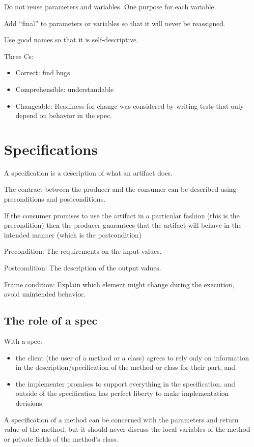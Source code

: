 \documentclass[letterpaper,12pt]{article}
\begin{document}
Do not reuse parameters and variables. One purpose for each variable.

Add ``final'' to parameters or variables so that it will never be reassigned.

Use good names so that it is self-descriptive.

Three Cs:
\begin{itemize}
      \item Correct: find bugs
      \item Comprehensible: understandable
      \item Changeable: Readiness for change was considered by writing tests that only
            depend on behavior in the spec.
\end{itemize}

\section{Specifications}
A specification is a description of what an artifact does.

The contract between the producer and the consumer can be described using
preconditions and postconditions.

If the consumer promises to use the artifact in a particular fashion (this is
the precondition) then the producer guarantees that the artifact will behave in
the intended manner (which is the postcondition)

Precondition: The requirements on the input values.

Postcondition: The description of the output values.

Frame condition: Explain which element might change during the execution, avoid
unintended behavior.
\subsection{The role of a spec}
With a spec:
\begin{itemize}
      \item the client (the user of a method or a class) agrees to rely only on information
            in the description/specification of the method or class for their part, and
      \item the implementer promises to support everything in the specification, and
            outside of the specification has perfect liberty to make implementation
            decisions.
\end{itemize}

A specification of a method can be concerned with the parameters and return
value of the method, but it should never discuss the local variables of the method
or private fields of the method's class.
\end{document}
